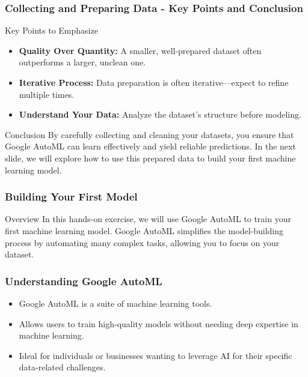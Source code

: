 \documentclass[aspectratio=169]{beamer}
\begin{document}
\begin{frame}[fragile]
    \frametitle{Collecting and Preparing Data - Key Points and Conclusion}
    \begin{block}{Key Points to Emphasize}
        \begin{itemize}
            \item \textbf{Quality Over Quantity:} A smaller, well-prepared dataset often outperforms a larger, unclean one.
            \item \textbf{Iterative Process:} Data preparation is often iterative—expect to refine multiple times.
            \item \textbf{Understand Your Data:} Analyze the dataset's structure before modeling.
        \end{itemize}
    \end{block}

    \begin{block}{Conclusion}
        By carefully collecting and cleaning your datasets, you ensure that Google AutoML can learn effectively and yield reliable predictions. In the next slide, we will explore how to use this prepared data to build your first machine learning model.
    \end{block}
\end{frame}

\begin{frame}[fragile]
    \frametitle{Building Your First Model}
    \begin{block}{Overview}
        In this hands-on exercise, we will use Google AutoML to train your first machine learning model. 
        Google AutoML simplifies the model-building process by automating many complex tasks, allowing you to focus on your dataset.
    \end{block}
\end{frame}

\begin{frame}[fragile]
    \frametitle{Understanding Google AutoML}
    \begin{itemize}
        \item Google AutoML is a suite of machine learning tools.
        \item Allows users to train high-quality models without needing deep expertise in machine learning.
        \item Ideal for individuals or businesses wanting to leverage AI for their specific data-related challenges.
    \end{itemize}
\end{frame}
\end{document}
